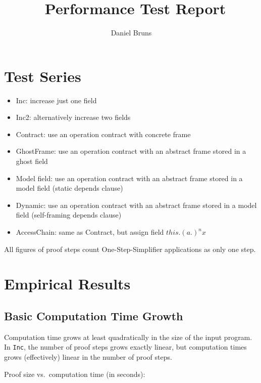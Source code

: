 \documentclass[a4paper]{article}
\title{\KeY\ Performance Test Report}
\author{Daniel Bruns}
\begin{document}
\maketitle

\section{Test Series}
\begin{itemize}
  \item Inc: increase just one field 
  \item Inc2: alternatively increase two fields
  \item Contract: use an operation contract with
		concrete frame
  \item GhostFrame: use an operation contract
		with an abstract frame stored in
		a ghost field
  \item Model field: use an operation contract
		with an abstract frame stored in
		a model field (static depends clause)
  \item Dynamic: use an operation contract
		with an abstract frame stored in
		a model field (self-framing depends clause)
  \item AccessChain: same as Contract, but assign field
	$\mathit{this}.(a.)^nx$
\end{itemize}

All figures of proof steps count One-Step-Simplifier applications
as only one step.

\section{Empirical Results}
\subsection{Basic Computation Time Growth}
Computation time grows at least quadratically in the
size of the input program.
In \texttt{Inc}, the number of proof steps grows
exactly linear, but computation times grows (effectively) linear in the number of proof steps.

Proof size vs.\ computation time (in seconds):\\
\end{document}

